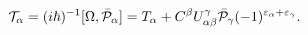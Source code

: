\begin{equation}\label{4.35}
{\cal T}_\alpha=(i\hbar)^{-1}[\Omega,\bar{\cal P}_\alpha]=T_\alpha+
C^\beta U^\gamma_{\alpha\beta}\bar{\cal P}_\gamma
(-1)^{\varepsilon_\alpha+\varepsilon_\gamma}.
\end{equation}

